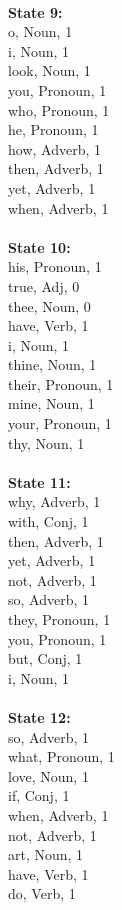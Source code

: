 \begin{multicols}{4}
\\
\textbf{State 9:} \\
o, Noun, 1\\
i, Noun, 1\\
look, Noun, 1\\
you, Pronoun, 1\\
who, Pronoun, 1\\
he, Pronoun, 1\\
how, Adverb, 1\\
then, Adverb, 1\\
yet, Adverb, 1\\
when, Adverb, 1\\
\\
\textbf{State 10:} \\
his, Pronoun, 1\\
true, Adj, 0\\
thee, Noun, 0\\
have, Verb, 1\\
i, Noun, 1\\
thine, Noun, 1\\
their, Pronoun, 1\\
mine, Noun, 1\\
your, Pronoun, 1\\
thy, Noun, 1\\
\\
\textbf{State 11:} \\
why, Adverb, 1\\
with, Conj, 1\\
then, Adverb, 1\\
yet, Adverb, 1\\
not, Adverb, 1\\
so, Adverb, 1\\
they, Pronoun, 1\\
you, Pronoun, 1\\
but, Conj, 1\\
i, Noun, 1\\
\\
\textbf{State 12:} \\
so, Adverb, 1\\
what, Pronoun, 1\\
love, Noun, 1\\
if, Conj, 1\\
when, Adverb, 1\\
not, Adverb, 1\\
art, Noun, 1\\
have, Verb, 1\\
do, Verb, 1\\

\end{multicols}
